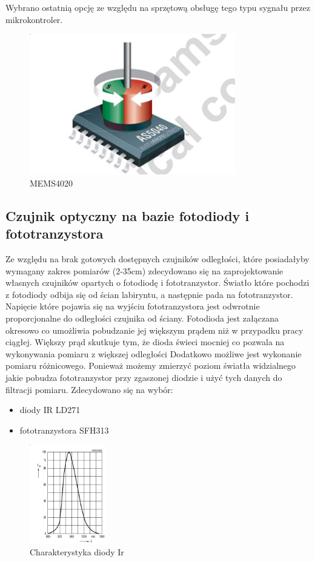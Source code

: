 \documentclass[12pt,a4paper,twoside,openright,fleqn]{mwrep}
\begin{document}
Wybrano ostatnią opcję ze względu na sprzętową obsługę tego typu sygnału przez mikrokontroler.

\begin{figure}[h]
\centering
\includegraphics[width=0.8\textwidth]{./images/MEMS4020}
\caption{MEMS4020}
\end{figure}

\subsection{Czujnik optyczny na bazie fotodiody i fototranzystora}

    Ze względu na brak gotowych dostępnych czujników odległości, które posiadałyby wymagany zakres pomiarów (2-35cm) zdecydowano się na zaprojektowanie własnych czujników opartych o fotodiodę i fototranzystor. Światło które pochodzi z fotodiody odbija się od ścian labiryntu, a następnie pada na fototranzystor. Napięcie które pojawia się na wyjściu fototranzystora jest odwrotnie proporcjonalne do odległości czujnika od ściany. Fotodioda jest załączana okresowo co umożliwia pobudzanie jej większym prądem niż w przypadku pracy ciągłej. Większy prąd skutkuje tym, że dioda świeci mocniej co pozwala na wykonywania pomiaru z większej odległości Dodatkowo możliwe jest wykonanie pomiaru różnicowego. Ponieważ możemy zmierzyć poziom światła widzialnego jakie pobudza fototranzystor przy zgaszonej diodzie i użyć tych danych do filtracji pomiaru. Zdecydowano się na wybór:

\begin{itemize}
        \item diody IR LD271 
        \item fototranzystora SFH313
\end{itemize}
    
\begin{figure}[h]
\centering
\includegraphics[width=0.3\textwidth]{./images/diodair}
\caption{Charakterystyka diody Ir}
\label{diodair}
\end{figure}
\end{document}
